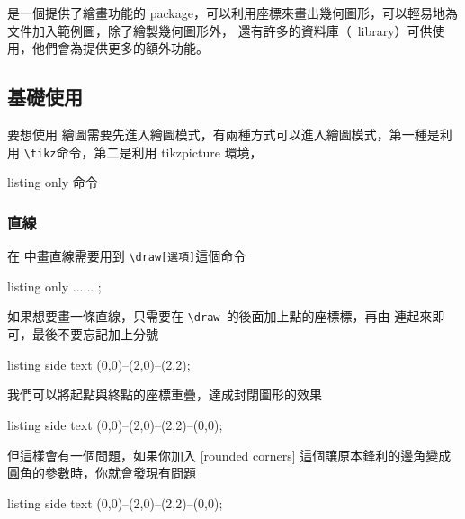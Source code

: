 \chapter{\TikZ}

\TikZ 是一個提供了繪畫功能的 package，可以利用座標來畫出幾何圖形，可以輕易地為文件加入範例圖，除了繪製幾何圖形外， \TikZ 還有許多的資料庫（\TikZ\ library）可供使用，他們會為\TikZ 提供更多的額外功能。

\section{基礎使用}

要想使用 \TikZ 繪圖需要先進入繪圖模式，有兩種方式可以進入繪圖模式，第一種是利用 \verb|\tikz|命令，第二是利用 tikzpicture 環境，

\begin{tcblisting}{listing only}
\tikz 命令
\end{tcblisting}

\subsection{直線}

在 \TikZ 中畫直線需要用到 \verb`\draw[選項]`這個命令

\begin{tcblisting}{listing only}
\draw[選項] ...... ;
\end{tcblisting}

如果想要畫一條直線，只需要在 \verb`\draw `的後面加上點的座標標，再由\-\- 連起來即可，最後不要忘記加上分號

\begin{tcblisting}{listing side text}
\tikz \draw (0,0)--(2,0)--(2,2);
\end{tcblisting}

我們可以將起點與終點的座標重疊，達成封閉圖形的效果

\begin{tcblisting}{listing side text}
\tikz \draw (0,0)--(2,0)--(2,2)--(0,0);
\end{tcblisting}

但這樣會有一個問題，如果你加入 [rounded corners] 這個讓原本鋒利的邊角變成圓角的參數時，你就會發現有問題

\begin{tcblisting}{listing side text}
\tikz {} (0,0)--(2,0)--(2,2)--(0,0);
\end{tcblisting}

